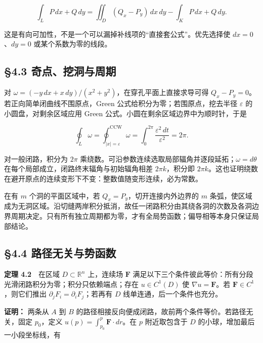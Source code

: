 \documentclass[11pt,a4paper]{article}
\begin{document}
\begin{equation*}
 \int_LP\,dx+Q\,dy
 =\iint_D(Q_x-P_y)\,dx\,dy-\int_KP\,dx+Q\,dy.\tag{4.4}
\end{equation*}

这是有向可加性，不是一个可以漏掉补线项的``直接套公式''。优先选择使
\(dx=0\)、\(dy=0\) 或某个系数为零的线段。

\subsection{§4.3
奇点、挖洞与周期}\label{ux5947ux70b9ux6316ux6d1eux4e0eux5468ux671f}

对 \(\omega=(-y\,dx+x\,dy)/(x^2+y^2)\)，在穿孔平面上直接求导可得
\(Q_x-P_y=0\)。若正向简单闭曲线不围原点，Green
公式给积分为零；若围原点，挖去半径 \(\varepsilon\)
的小圆盘，对剩余区域应用 Green 公式。小圆在剩余区域边界中为顺时针，于是

\begin{equation*}
 \oint_L\omega=\oint_{|x|=\varepsilon}^{\mathrm{CCW}}\omega
 =\int_0^{2\pi}\frac{\varepsilon^2\,dt}{\varepsilon^2}=2\pi.\tag{4.5}
\end{equation*}

对一般闭路，积分为 \(2\pi\)
乘绕数。可沿参数连续选取局部辐角并逐段延拓；\(\omega=d\theta\)
在每个局部成立，闭路终末辐角与初始辐角相差 \(2\pi k\)，积分即
\(2\pi k\)。这也证明绕数在避开原点的连续变形下不变：整数值随变形连续，必为常数。

在有 \(m\) 个洞的平面区域中，若 \(Q_x=P_y\)，切开连接内外边界的 \(m\)
条弧，使区域成为无洞区域。沿切缝两岸积分抵消，故任一闭路积分由其绕各洞的次数及各洞边界周期决定。只有所有独立周期都为零，才有全局势函数；偏导相等本身只保证局部结论。

\subsection{§4.4
路径无关与势函数}\label{ux8defux5f84ux65e0ux5173ux4e0eux52bfux51fdux6570}

\textbf{定理 4.2}　在区域 \(D\subset\mathbb R^n\) 上，连续场
\(\mathbf F\)
满足以下三个条件彼此等价：所有分段光滑闭路积分为零；积分只依赖端点；存在
\(u\in C^1(D)\) 使 \(\nabla u=\mathbf F\)。若
\(\mathbf F\in C^1\)，则它们推出 \(\partial_jF_i=\partial_iF_j\)；若再有
\(D\) 线单连通，后一个条件也充分。

\textbf{证明：} 两条从 \(A\) 到 \(B\)
的路径相接反向便成闭路，故前两个条件等价。若路径无关，固定 \(p_0\)，定义
\(u(p)=\int_{p_0}^p\mathbf F\cdot dr\)。在 \(p\) 附近取包含于 \(D\)
的小球，增加最后一小段坐标线，有
\end{document}
